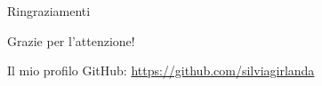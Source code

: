 \documentclass{beamer} %
\begin{document}
\begin{frame}{Ringraziamenti}
            \begin{center}
                {\huge Grazie per l'attenzione!}\\
                \bigskip
                \bigskip
                \bigskip
                \bigskip
                \bigskip
                \bigskip
                \bigskip
                \bigskip
            \end{center}
        Il mio profilo GitHub: \url{https://github.com/silviagirlanda} \end{frame}
\end{document}
